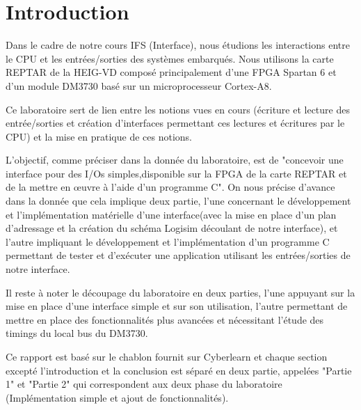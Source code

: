 \section{Introduction}

Dans le cadre de notre cours IFS (Interface), nous étudions les interactions entre le CPU et les entrées/sorties des systèmes embarqués. Nous utilisons la carte REPTAR de la HEIG-VD composé principalement d'une FPGA Spartan 6 et d'un module DM3730 basé sur un microprocesseur Cortex-A8.\\\par
Ce laboratoire sert de lien entre les notions vues en cours (écriture et lecture des entrée/sorties et création d'interfaces permettant ces lectures et écritures par le CPU) et la mise en pratique de ces notions.\\\par
L'objectif, comme préciser dans la donnée du laboratoire, est de "concevoir une interface pour des I/Os simples,disponible sur la FPGA de la carte REPTAR et de la mettre en œuvre à l'aide d'un programme C". On nous précise d'avance dans la donnée que cela implique deux partie, l'une concernant le développement et l'implémentation matérielle d'une interface(avec la mise en place d'un plan d'adressage et la création du schéma Logisim découlant de notre interface), et l'autre impliquant le développement et l'implémentation d'un programme C permettant de tester et d'exécuter une application utilisant les entrées/sorties de notre interface.\\\par
Il reste à noter le découpage du laboratoire en deux parties, l'une appuyant sur la mise en place d'une interface simple et sur son utilisation, l'autre permettant de mettre en place des fonctionnalités plus avancées et nécessitant l'étude des timings du local bus du DM3730.\\\par
Ce rapport est basé sur le chablon fournit sur Cyberlearn et chaque section excepté l'introduction et la conclusion est séparé en deux partie, appelées "Partie 1" et "Partie 2" qui correspondent aux deux phase du laboratoire (Implémentation simple et ajout de fonctionnalités).

